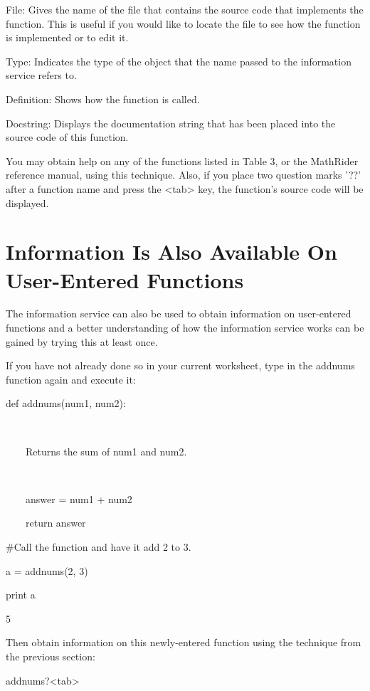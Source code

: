 \documentclass[12pt,oneside]{book}
\begin{document}
File: Gives the name of the file that contains the source code that implements the function. This is useful if you would like to locate the file to see how the function is implemented or to edit it. 

Type: Indicates the type of the object that the name passed to the information service refers to.


Definition: Shows how the function is called.


Docstring: Displays the documentation string that has been placed into the source code of this function. 

You may obtain help on any of the functions listed in Table 3, or the MathRider reference manual, using this technique. Also, if you place two question marks '??' after a function name and press the {\textless}tab{\textgreater} key, the function's source code will be displayed.

\section[Information Is Also Available On User{}-Entered Functions]{Information Is Also Available On User{}-Entered Functions}

The information service can also be used to obtain information on user{}-entered functions and a better understanding of how the information service works can be gained by trying this at least once. 

If you have not already done so in your current worksheet, type in the addnums function again and execute it:  

def addnums(num1, num2):

\ \ \ \ {\textquotedbl}{\textquotedbl}{\textquotedbl}

\ \ \ \ Returns the sum of num1 and num2.

\ \ \ \ {\textquotedbl}{\textquotedbl}{\textquotedbl}

\ \ \ \ answer = num1 + num2

\ \ \ \ return answer


\#Call the function and have it add 2 to 3.

a = addnums(2, 3)

print a

{\textbar}

5


Then obtain information on this newly{}-entered function using the technique from the previous section: 

addnums?{\textless}tab{\textgreater}
\end{document}
